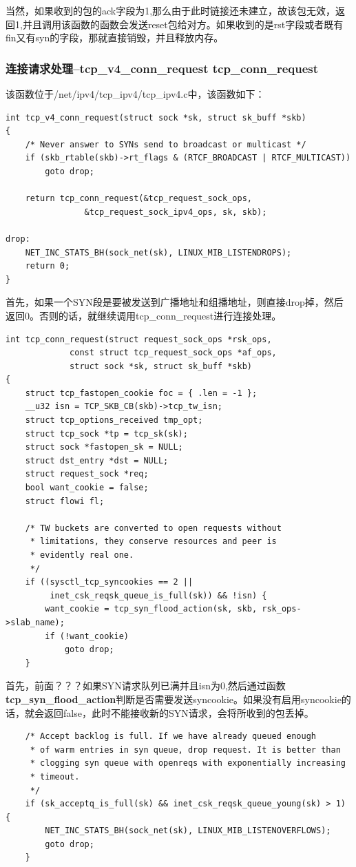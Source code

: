                 当然，如果收到的包的ack字段为1,那么由于此时链接还未建立，故该包无效，返回1,并且调用该函数的函数会发送reset包给对方。如果收到的是rst字段或者既有fin又有syn的字段，那就直接销毁，并且释放内存。
            \subsubsection{连接请求处理--tcp\_v4\_conn\_request  tcp\_conn\_request}
                该函数位于/net/ipv4/tcp\_ipv4/tcp\_ipv4.c中，该函数如下：
\begin{verbatim}
int tcp_v4_conn_request(struct sock *sk, struct sk_buff *skb)
{
    /* Never answer to SYNs send to broadcast or multicast */
    if (skb_rtable(skb)->rt_flags & (RTCF_BROADCAST | RTCF_MULTICAST))
        goto drop;

    return tcp_conn_request(&tcp_request_sock_ops,
                &tcp_request_sock_ipv4_ops, sk, skb);

drop:
    NET_INC_STATS_BH(sock_net(sk), LINUX_MIB_LISTENDROPS);
    return 0;
}
\end{verbatim}
                
        首先，如果一个SYN段是要被发送到广播地址和组播地址，则直接drop掉，然后返回0。否则的话，就继续调用tcp\_conn\_request进行连接处理。
\begin{verbatim}
int tcp_conn_request(struct request_sock_ops *rsk_ops,
             const struct tcp_request_sock_ops *af_ops,
             struct sock *sk, struct sk_buff *skb)
{
    struct tcp_fastopen_cookie foc = { .len = -1 };
    __u32 isn = TCP_SKB_CB(skb)->tcp_tw_isn;
    struct tcp_options_received tmp_opt;
    struct tcp_sock *tp = tcp_sk(sk);
    struct sock *fastopen_sk = NULL;
    struct dst_entry *dst = NULL;
    struct request_sock *req;
    bool want_cookie = false;
    struct flowi fl;

    /* TW buckets are converted to open requests without
     * limitations, they conserve resources and peer is
     * evidently real one.
     */
    if ((sysctl_tcp_syncookies == 2 ||
         inet_csk_reqsk_queue_is_full(sk)) && !isn) {
        want_cookie = tcp_syn_flood_action(sk, skb, rsk_ops->slab_name);
        if (!want_cookie)
            goto drop;
    }
\end{verbatim}
                首先，前面？？？如果SYN请求队列已满并且isn为0,然后通过函数\textbf{tcp\_syn\_flood\_action}判断是否需要发送syncookie。如果没有启用syncookie的话，就会返回false，此时不能接收新的SYN请求，会将所收到的包丢掉。
\begin{verbatim}
    /* Accept backlog is full. If we have already queued enough
     * of warm entries in syn queue, drop request. It is better than
     * clogging syn queue with openreqs with exponentially increasing
     * timeout.
     */
    if (sk_acceptq_is_full(sk) && inet_csk_reqsk_queue_young(sk) > 1) {
        NET_INC_STATS_BH(sock_net(sk), LINUX_MIB_LISTENOVERFLOWS);
        goto drop;
    }
\end{verbatim}

